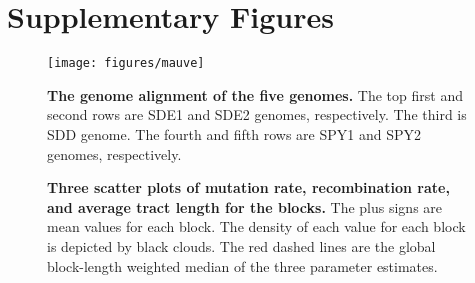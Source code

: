 \documentclass[10pt]{article}
\newcommand{\lyxdot}{.}
\begin{document}
\clearpage{}
\section*{Supplementary Figures}

\begin{figure}[!ht]
\begin{center}
\texttt{[image: figures/mauve]}
\end{center}
\caption{\label{fig:mauve}
{\bf The genome alignment of the five genomes.} The top
first and second rows are SDE1 and SDE2 genomes, respectively. The third is SDD
genome. The fourth and fifth rows are SPY1 and SPY2 genomes, respectively.}
\end{figure}
\clearpage{}


\begin{figure}[!ht]
\begin{center}


\end{center}
\caption{
{\bf Three scatter plots of mutation rate, recombination
rate, and average tract length for the blocks.} The plus signs are mean values
for each block. The density of each value for each block is depicted by black
clouds.  The red dashed lines are the global block-length weighted median of the
three parameter estimates.}
\end{figure}
\label{fig:scatter3}
\clearpage{}%
\end{document}
